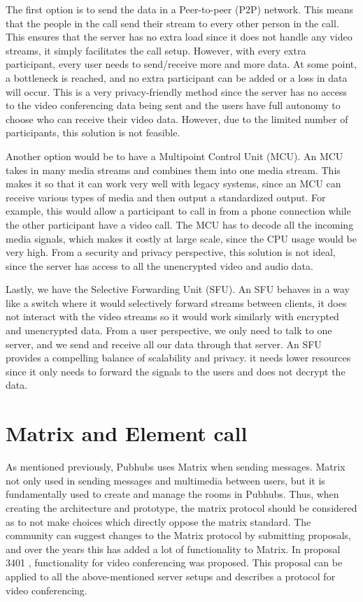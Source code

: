 \documentclass{report}
\begin{document}
The first option is to send the data in a Peer-to-peer (P2P) network. This means that the people in the call send their stream to every other person in the call. This ensures that the server has no extra load since it does not handle any video streams, it simply facilitates the call setup. However, with every extra participant, every user needs to send/receive more and more data. At some point, a bottleneck is reached, and no extra participant can be added or a loss in data will occur. This is a very privacy-friendly method since the server has no access to the video conferencing data being sent and the users have full autonomy to choose who can receive their video data. However, due to the limited number of participants, this solution is not feasible.

Another option would be to have a Multipoint Control Unit (MCU). An MCU takes in many media streams and combines them into one media stream. This makes it so that it can work very well with legacy systems, since an MCU can receive various types of media and then output a standardized output. For example, this would allow a participant to call in from a phone connection while the other participant have a video call. The MCU has to decode all the incoming media signals, which makes it costly at large scale, since the CPU usage would be very high. From a security and privacy perspective, this solution is not ideal, since the server has access to all the unencrypted video and audio data. 

Lastly, we have the Selective Forwarding Unit (SFU). An SFU behaves in a way like a switch where it would selectively forward streams between clients, it does not interact with the video streams so it would work similarly with encrypted and unencrypted data. From a user perspective, we only need to talk to one server, and we send and receive all our data through that server. An SFU provides a compelling balance of scalability and privacy. it needs lower resources since it only needs to forward the signals to the users and does not decrypt the data. 

\section{Matrix and Element call}
As mentioned previously, Pubhubs uses Matrix when sending messages. Matrix not only used in sending messages and multimedia between users, but it is fundamentally used to create and manage the rooms in Pubhubs. Thus, when creating the architecture and prototype, the matrix protocol should be considered as to not make choices which directly oppose the matrix standard. The community can suggest changes to the Matrix protocol by submitting proposals, and over the years this has added a lot of functionality to Matrix. In proposal 3401 \cite{MATRIX_VIDEO_CALL_PROP}, functionality for video conferencing was proposed. This proposal can be applied to all the above-mentioned server setups and describes a protocol for video conferencing. 
\end{document}
